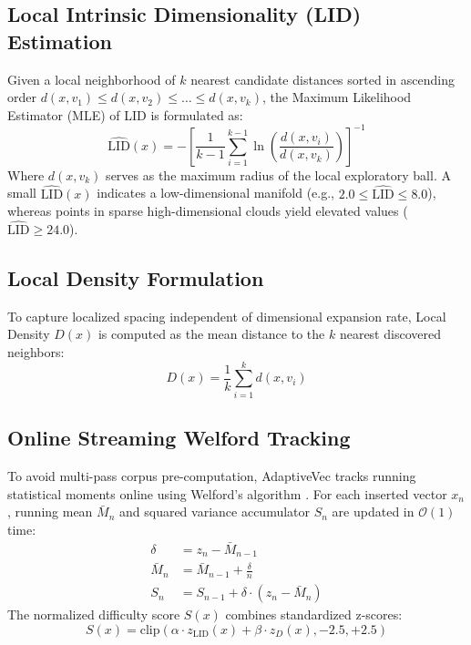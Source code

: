 \documentclass[conference,10pt]{IEEEtran}
\begin{document}
\subsection{Local Intrinsic Dimensionality (LID) Estimation}
Given a local neighborhood of $k$ nearest candidate distances sorted in ascending order $d(x, v_1) \le d(x, v_2) \le \dots \le d(x, v_k)$, the Maximum Likelihood Estimator (MLE) of LID \cite{levina2005mle, amsaleg2015lid} is formulated as:
\begin{equation}
\widehat{\text{LID}}(x) = -\left[ \frac{1}{k - 1} \sum_{i=1}^{k-1} \ln \left( \frac{d(x, v_i)}{d(x, v_k)} \right) \right]^{-1}
\end{equation}
Where $d(x, v_k)$ serves as the maximum radius of the local exploratory ball. A small $\widehat{\text{LID}}(x)$ indicates a low-dimensional manifold (e.g., $2.0 \le \widehat{\text{LID}} \le 8.0$), whereas points in sparse high-dimensional clouds yield elevated values ($\widehat{\text{LID}} \ge 24.0$).

\subsection{Local Density Formulation}
To capture localized spacing independent of dimensional expansion rate, Local Density $D(x)$ is computed as the mean distance to the $k$ nearest discovered neighbors:
\begin{equation}
D(x) = \frac{1}{k} \sum_{i=1}^k d(x, v_i)
\end{equation}

\subsection{Online Streaming Welford Tracking}
To avoid multi-pass corpus pre-computation, AdaptiveVec tracks running statistical moments online using Welford's algorithm \cite{welford1962note}. For each inserted vector $x_n$, running mean $\bar{M}_n$ and squared variance accumulator $S_n$ are updated in $\mathcal{O}(1)$ time:
\begin{align}
\delta &= z_n - \bar{M}_{n-1} \\
\bar{M}_n &= \bar{M}_{n-1} + \frac{\delta}{n} \\
S_n &= S_{n-1} + \delta \cdot (z_n - \bar{M}_n)
\end{align}
The normalized difficulty score $S(x)$ combines standardized z-scores:
\begin{equation}
S(x) = \text{clip}\left( \alpha \cdot z_{\text{LID}}(x) + \beta \cdot z_D(x), -2.5, +2.5 \right)
\end{equation}
\end{document}
